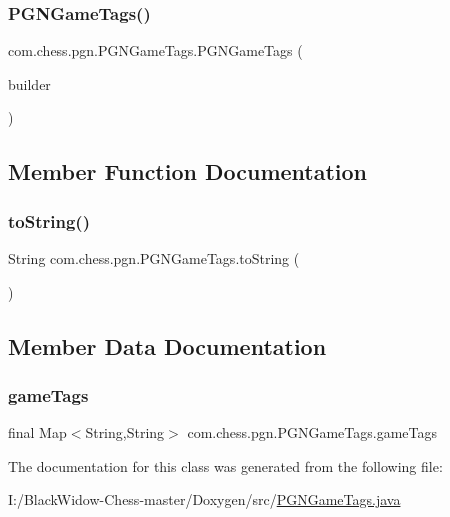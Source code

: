 \subsubsection{\texorpdfstring{PGNGameTags()}{PGNGameTags()}}
{\footnotesize\ttfamily com.\+chess.\+pgn.\+P\+G\+N\+Game\+Tags.\+P\+G\+N\+Game\+Tags (\begin{DoxyParamCaption}\item[{final \mbox{\hyperlink{classcom_1_1chess_1_1pgn_1_1_p_g_n_game_tags_1_1_tags_builder}{Tags\+Builder}}}]{builder }\end{DoxyParamCaption})\hspace{0.3cm}{\ttfamily [private]}}



\subsection{Member Function Documentation}
\mbox{\label{classcom_1_1chess_1_1pgn_1_1_p_g_n_game_tags_ade3d9fafb7227f1ef8f49735de5341f3}} 
\subsubsection{\texorpdfstring{toString()}{toString()}}
{\footnotesize\ttfamily String com.\+chess.\+pgn.\+P\+G\+N\+Game\+Tags.\+to\+String (\begin{DoxyParamCaption}{ }\end{DoxyParamCaption})}



\subsection{Member Data Documentation}
\mbox{\label{classcom_1_1chess_1_1pgn_1_1_p_g_n_game_tags_aa7d57cc391d1e4910d11737834b23a04}} 
\subsubsection{\texorpdfstring{gameTags}{gameTags}}
{\footnotesize\ttfamily final Map$<$String,String$>$ com.\+chess.\+pgn.\+P\+G\+N\+Game\+Tags.\+game\+Tags\hspace{0.3cm}{\ttfamily [private]}}



The documentation for this class was generated from the following file\+:\begin{DoxyCompactItemize}
\item 
I\+:/\+Black\+Widow-\/\+Chess-\/master/\+Doxygen/src/\mbox{\hyperlink{_p_g_n_game_tags_8java}{P\+G\+N\+Game\+Tags.\+java}}\end{DoxyCompactItemize}
